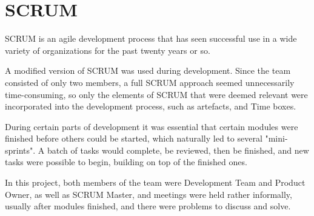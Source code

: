   \section{SCRUM}
  SCRUM is an agile development process that has seen successful use in a wide variety of organizations for the past twenty years or so.\cite{scrum_success} \cite{scrum_history}
  
  A modified version of SCRUM was used during development. Since the team consisted of only two members, a full SCRUM approach seemed unnecessarily time-consuming, so only the elements of SCRUM that were deemed relevant were incorporated into the development process, such as artefacts, and Time boxes. 
  
  During certain parts of development it was essential that certain modules were finished before others could be started, which naturally led to several "mini-sprints". A batch of tasks would complete, be reviewed, then be finished, and new tasks were possible to begin, building on top of the finished ones.
  
  In this project, both members of the team were Development Team and Product Owner, as well as SCRUM Master, and meetings were held rather informally, usually after modules finished, and there were problems to discuss and solve. 